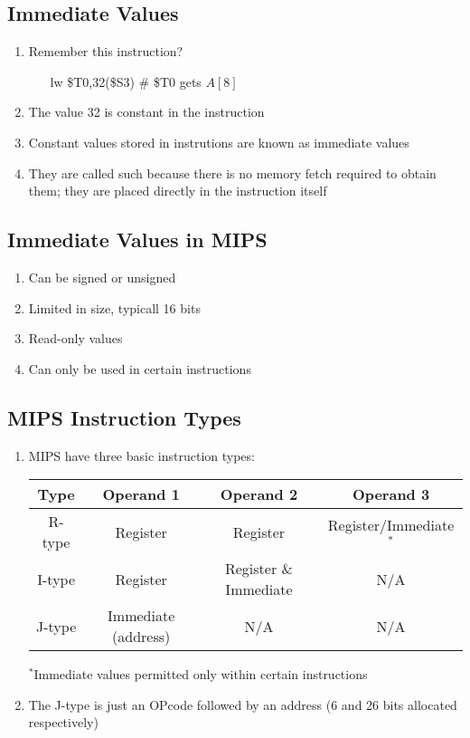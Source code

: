 \documentclass[12pt]{article}
\begin{document}
\subsection{Immediate Values}
\begin{enumerate}
  \item Remember this instruction?
  \begin{enumerate}
    \item[lw] \$T0,32(\$S3) \# \$T0 gets $A[8]$
  \end{enumerate}
  \item The value 32 is constant in the instruction
  \item Constant values stored in instrutions are known as immediate values
  \item They are called such because there is no memory fetch required to obtain them; they are placed directly in the instruction itself
\end{enumerate}



\subsection{Immediate Values in MIPS}
\begin{enumerate}
  \item Can be signed or unsigned
  \item Limited in size, typicall 16 bits
  \item Read-only values
  \item Can only be used in certain instructions
\end{enumerate}



\subsection{MIPS Instruction Types}
\begin{enumerate}
  \item MIPS have three basic instruction types:
\begin{center}
  \begin{tabular}{|c|c|c|c|} \hline
    Type & Operand 1 & Operand 2 & Operand 3 \\ \hline \hline
    R-type & Register & Register & Register/Immediate$^{*}$ \\ \hline
    I-type & Register & Register \& Immediate & N/A \\ \hline
    J-type & Immediate (address) & N/A & N/A \\ \hline
  \end{tabular}
  $^{*}$Immediate values permitted only within certain instructions
\end{center}
\item The J-type is just an OPcode followed by an address (6 and 26 bits allocated respectively)
\end{enumerate}
\end{document}
